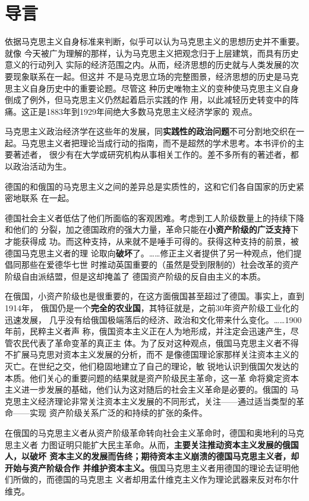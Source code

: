 \chapter*{导言}
{}

依据马克思主义自身标准来判断，似乎可以认为马克思主义的思想历史并不重要。就像
今天被广为理解的那样，认为马克思主义把观念归于上层建筑，而具有历史意义的行动列入
实际的经济范围之内。从而，经济思想的历史就与人类发展的次要现象联系在一起。但这并
不是马克思立场的完整图景，经济思想的历史是马克思主义自身历史中的重要论题。尽管这
种历史唯物主义的变种使马克思主义自身倒成了例外，但马克思主义仍然起着启示实践的作
用，以此减轻历史转变中的阵痛。这正是1883年到1929年间绝大多数马克思主义经济学家的
观点。

马克思主义政治经济学在这些年的发展，同\textbf{实践性的政治问题}不可分割地交织在一
起。马克思主义者把理论当成行动的指南，而不是超然的学术思考。本书评价的主要著述者，
很少有在大学或研究机构从事相关工作的。差不多所有的著述者，都以政治活动为生。

德国的和俄国的马克思主义之间的差异总是实质性的，这和它们各自国家的历史紧密地联系
在一起。

德国社会主义者低估了他们所面临的客观困难。考虑到工人阶级数量上的持续下降和他们的
分裂，加之德国政府的强大力量，革命只能在\textbf{小资产阶级的广泛支持}下才能获得成
功。而这种支持，从来就不是唾手可得的。获得这种支持的前景，被德国马克思主义者的理
论取向\textbf{破坏}了。……修正主义者提供了另一种观点，他们提倡同那些在爱德华七世
时推动英国重要的（虽然是受到限制的）社会改革的资产阶级自由派结盟，但是这却掩盖了
德国资产阶级的反自由主义的本质。

在俄国，小资产阶级也是很重要的，在这方面俄国甚至超过了德国。事实上，直到1914年，
俄国仍是一个\textbf{完全的农业国}，其特征就是，之前30年资产阶级工业化的迅速发展，
几乎没有给俄国极端落后的经济、政治和文化带来什么变化。……1900年前，民粹主义者声
称，俄国资本主义正在人为地形成，并注定会迅速产生，尽管农民代表了革命变革的真正主
体。为了反对这种观点，俄国马克思主义者不得不扩展马克思对资本主义发展的分析，而不
是像德国理论家那样关注资本主义的灭亡。在世纪之交，他们稳固地建立了自己的理论，敏
锐地认识到俄国欠发达的本质。他们关心的重要问题的结果就是资产阶级民主革命，这一革
命将奠定资本主义进一步发展的基础，他们认为这对随后的社会主义革命是必要的。俄国的
马克思主义经济理论非常关注资本主义发展的不同形式，关注——通过适当类型的革命——实现
资产阶级关系广泛的和持续的扩张的条件。

在俄国的马克思主义者从资产阶级革命转向社会主义革命时，德国和奥地利的马克思主义者
力图证明只能扩大民主革命。从而，\textbf{主要关注推动资本主义发展的俄国人，以破坏
  资本主义的发展而告终；期待资本主义崩溃的德国马克思主义者，却开始与资产阶级合作
  并维护资本主义。}俄国马克思主义者用德国的理论去证明他们所做的，而德国的马克思主
义者却用孟什维克主义作为理论武器来反对布尔什维克。

